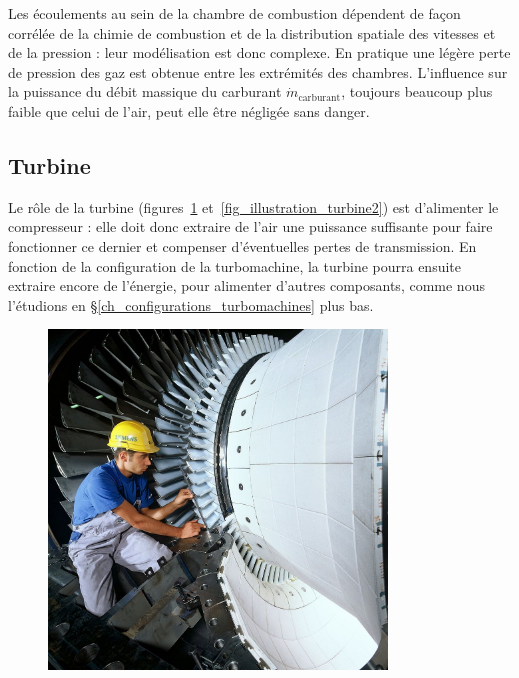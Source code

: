 		Les écoulements au sein de la chambre de combustion dépendent de façon corrélée de la chimie de combustion et de la distribution spatiale des vitesses et de la pression : leur modélisation est donc complexe. En pratique une légère perte de pression des gaz est obtenue entre les extrémités des chambres. L’influence sur la puissance du débit massique du carburant $\dot m_\text{carburant}$, toujours beaucoup plus faible que celui de l’air, peut elle être négligée sans danger.


	\subsection{Turbine}

		Le rôle de la turbine (figures~\ref{fig_illustration_turbine1} et~\ref{fig_illustration_turbine2}) est d’alimenter le compresseur : elle doit donc extraire de l’air une puissance suffisante pour faire fonctionner ce dernier et compenser d’éventuelles pertes de transmission. En fonction de la configuration de la turbomachine, la turbine pourra ensuite extraire encore de l’énergie, pour alimenter d’autres composants, comme nous l’étudions en \S\ref{ch_configurations_turbomachines} plus bas.

		\begin{figure}
			\begin{center}
				\includegraphics[width=9cm]{images/photo_turbine.jpg}%
			\end{center}
			\label{fig_illustration_turbine1}
		\end{figure}

